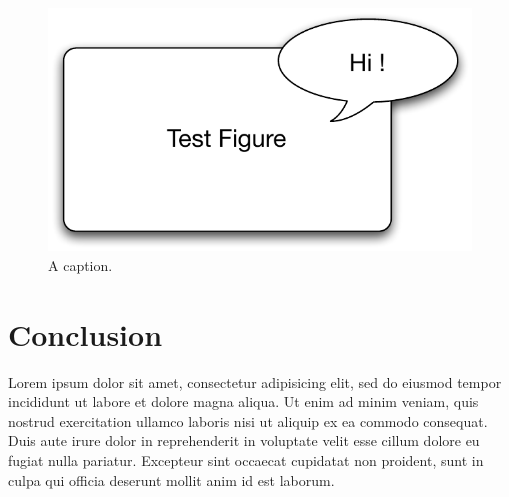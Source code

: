 \documentclass{chi-ext}
\begin{document}
\begin{multicols}{2}
\begin{figure}
 \includegraphics[width=\columnwidth]{figure.pdf}
 \caption{A caption.}
 \label{fig:figure}
\end{figure}


\section{Conclusion}

Lorem ipsum dolor sit amet, consectetur adipisicing elit, sed do eiusmod tempor incididunt ut labore
et dolore magna aliqua. Ut enim ad minim veniam, quis nostrud exercitation ullamco laboris nisi ut
aliquip ex ea commodo consequat. Duis aute irure dolor in reprehenderit in voluptate velit esse
cillum dolore eu fugiat nulla pariatur. Excepteur sint occaecat cupidatat non proident, sunt in
culpa qui officia deserunt mollit anim id est laborum.




\end{multicols}
\end{document}
